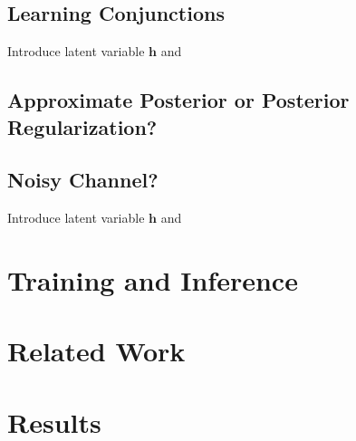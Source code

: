 \documentclass{article}
\newcommand{\bh}{\mathbf{h}}
\begin{document}
\subsection{Learning Conjunctions}
Introduce latent variable $\bh$ and 

\subsection{Approximate Posterior or Posterior Regularization?}

\subsection{Noisy Channel?}
Introduce latent variable $\bh$ and 

\section{Training and Inference}

\section{Related Work}

\section{Results}



\end{document}
